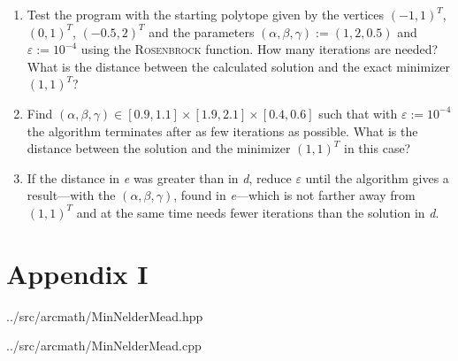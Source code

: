 \documentclass[11pt,oneside]{extarticle}
\begin{document}
\begin{enumerate}
    \item Test the program with the starting polytope given by the vertices
        $(-1,1)^T$, $(0,1)^T$, $(-0.5,2)^T$ and the parameters
        $(\alpha,\beta,\gamma):=(1,2,0.5)$ and $\varepsilon := 10^{-4}$ using
        the \textsc{Rosenbrock} function. How many iterations are needed? What
        is the distance between the calculated solution and the exact minimizer
        $(1,1)^T$?

    \item Find $(\alpha, \beta, \gamma ) \in \left[ 0.9,1.1\right] \times
        \left[1.9,2.1\right] \times \left[0.4,0.6\right]$ such that with
        $\varepsilon := 10^{-4}$ the algorithm terminates after as few iterations
        as possible. What is the distance between the solution and the minimizer
        $(1,1)^T$ in this case?

    \item If the distance in \emph{e} was greater than in \emph{d}, reduce
        $\varepsilon$ until the algorithm gives a result---with the $(\alpha,\beta,\gamma)$,
        found in \emph{e}---which is not farther away from $(1,1)^T$ and at the same
        time needs fewer iterations than the solution in \emph{d}.

\end{enumerate}

\section{Appendix I}

\begingroup
{}\selectfont

{../src/arcmath/MinNelderMead.hpp}
\endgroup

\begingroup
{}\selectfont
\lstset{language=c++,
    showstringspaces=false
}

{../src/arcmath/MinNelderMead.cpp}
\endgroup
\end{document}
